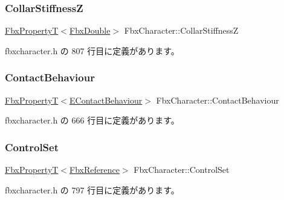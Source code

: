 \mbox{\label{class_fbx_character_aed64ee1f0b716afbaba511e81fbcaf8d}} 
\subsubsection{\texorpdfstring{Collar\+StiffnessZ}{CollarStiffnessZ}}
{\footnotesize\ttfamily \hyperlink{class_fbx_property_t}{Fbx\+PropertyT}$<$\hyperlink{fbxtypes_8h_a171e72a1c46fc15c1a6c9c31948c1c5b}{Fbx\+Double}$>$ Fbx\+Character\+::\+Collar\+StiffnessZ}



 fbxcharacter.\+h の 807 行目に定義があります。

\mbox{\label{class_fbx_character_a7fa2029676264df553457d41f5e4461b}} 
\subsubsection{\texorpdfstring{Contact\+Behaviour}{ContactBehaviour}}
{\footnotesize\ttfamily \hyperlink{class_fbx_property_t}{Fbx\+PropertyT}$<$\hyperlink{class_fbx_character_a44b6e7961224e21a78dbf91295e480fc}{E\+Contact\+Behaviour}$>$ Fbx\+Character\+::\+Contact\+Behaviour}



 fbxcharacter.\+h の 666 行目に定義があります。

\mbox{\label{class_fbx_character_a63ee7beafdba6113be07c3947d83a245}} 
\subsubsection{\texorpdfstring{Control\+Set}{ControlSet}}
{\footnotesize\ttfamily \hyperlink{class_fbx_property_t}{Fbx\+PropertyT}$<$\hyperlink{fbxtypes_8h_a44df6a2eec915cf27cd481e5c5e48a24}{Fbx\+Reference}$>$ Fbx\+Character\+::\+Control\+Set}



 fbxcharacter.\+h の 797 行目に定義があります。

